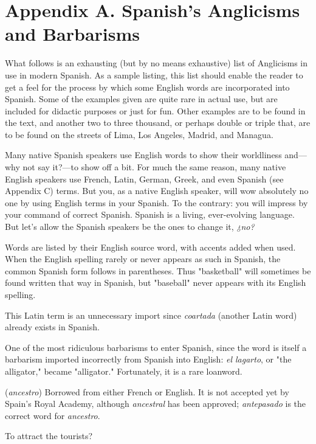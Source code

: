 \chapter{Appendix A. Spanish's Anglicisms and Barbarisms}
What follows is an exhausting (but by no means exhaustive)
list of Anglicisms in use in modern Spanish. As a sample listing, this
list should enable the reader to get a feel for the process by which
some English words are incorporated into Spanish. Some of the examples given are quite rare in actual use, but are included for didactic
purposes or just for fun. Other examples are to be found in the text,
and another two to three thousand, or perhaps double or triple that, are
to be found on the streets of Lima, Los Angeles, Madrid, and Managua.

Many native Spanish speakers use English words to show their
worldliness and---why not say it?---to show off a bit. For much the
same reason, many native English speakers use French, Latin, German,
Greek, and even Spanish (see Appendix C) terms. But you, as a native
English speaker, will wow absolutely no one by using English terms in
your Spanish. To the contrary: you will impress by your command of
correct Spanish. Spanish is a living, ever-evolving language. But let's
allow the Spanish speakers be the ones to change it, \emph{¿no?}

Words are listed by their English source word, with accents
added when used. When the English spelling rarely or never appears
as such in Spanish, the common Spanish form follows in parentheses.
Thus "basketball" will sometimes be found written that way in Spanish, but "baseball" never appears with its English spelling.

\bsk

 This Latin term is an unnecessary import since \emph{coartada} (another Latin word) already exists in Spanish.

 One of the most ridiculous barbarisms to enter
Spanish, since the word is itself a barbarism imported incorrectly from
Spanish into English: \emph{el lagarto}, or "the alligator," became "alligator."
Fortunately, it is a rare loanword.

 (\emph{ancestro}) Borrowed from either French or English.
It is not accepted yet by Spain's Royal Academy, although \emph{ancestral}
has been approved; \emph{antepasado} is the correct word for \emph{ancestro}.

 To attract the tourists?

